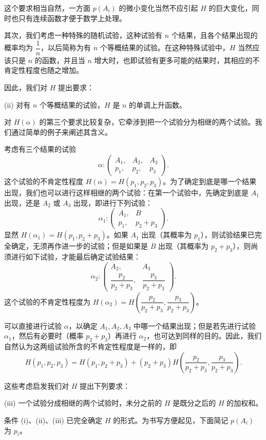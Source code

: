 \documentclass[../../main.tex]{subfiles}
\begin{document}
这个要求相当自然，一方面 $p(A_i)$ 的微小变化当然不应引起 $H$ 的巨大变化，同时也只有连续函数才便于数学上处理。

其次，我们考虑一种特殊的随机试验，这种试验有 $n$ 个结果，且各个结果出现的概率均为 $\dfrac{1}{n}$，以后简称为有 $n$ 个等概结果的试验。在这种特殊试验中，$H$ 当然应该只是 $n$ 的函数，并且当 $n$ 增大时，也即试验有更多可能的结果时，其相应的不肯定性程度也随之增加。

因此，我们对 $H$ 提出要求：

(ii) 对有 $n$ 个等概结果的试验，$H$ 是 $n$ 的单调上升函数。

对 $H(\alpha)$ 的第三个要求比较复杂，它牵涉到把一个试验分为相继的两个试验。我们通过简单的例子来阐述其含义。

考虑有三个结果的试验
\[
\alpha:\begin{pmatrix}A_1,&A_2,&A_3\\p_1,&p_2,&p_3\end{pmatrix}.
\]
这个试验的不肯定性程度 $H(\alpha)=H(p_1,p_2,p_3)$。为了确定到底是哪一个结果出现，我们也可以进行这样相继的两个试验：在第一个试验中，先确定到底是 $A_1$ 出现，还是 $A_2$ 或 $A_3$ 出现，即进行下列试验：
\[
\alpha_1:\begin{pmatrix}A_1,&B\\p_1,&p_2+p_3\end{pmatrix}.
\]
显然 $H(\alpha_1)=H(p_1,p_2+p_3)$。如果 $A_1$ 出现（其概率为 $p_1$），则试验结果已完全确定，无须再作进一步的试验；但是如果是 $B$ 出现（其概率为 $p_2+p_3$），则尚须进行如下试验，才能最后确定试验结果：
\[
\alpha_2:\begin{pmatrix}A_2,&A_3\\\dfrac{p_2}{p_2+p_3},&\dfrac{p_3}{p_2+p_3}\end{pmatrix}.
\]
这个试验的不肯定性程度为 $H(\alpha_2)=H\left(\dfrac{p_2}{p_2+p_3},\dfrac{p_3}{p_2+p_3}\right)$。

可以直接进行试验 $\alpha$，以确定 $A_1,A_2,A_3$ 中哪一个结果出现；但是若先进行试验 $\alpha_1$，然后有必要时（概率 $p_2+p_3$）再进行 $\alpha_2$，也可达到同样的目的。因此，我们自然认为这两组试验所含的不肯定性程度是一样的，即
\[
H(p_1,p_2,p_3)=H(p_1,p_2+p_3)+(p_2+p_3)H\left(\frac{p_2}{p_2+p_3},\frac{p_3}{p_2+p_3}\right).
\]

这些考虑启发我们对 $H$ 提出下列要求：

(iii) 一个试验分成相继的两个试验时，未分之前的 $H$ 是既分之后的 $H$ 的加权和。

条件 (i)、(ii)、(iii) 已完全确定 $H$ 的形式。为书写方便起见，下面简记 $p(A_i)$ 为 $p_i$。
\end{document}
